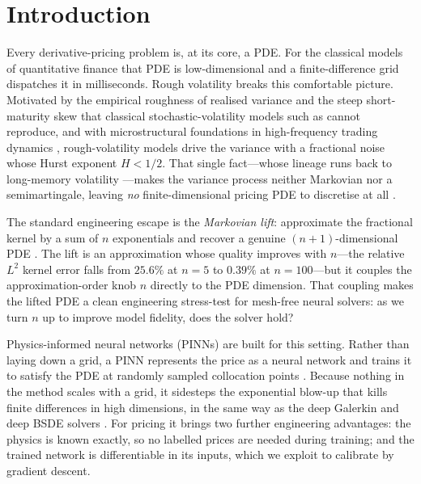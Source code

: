 \documentclass[review,12pt]{elsarticle}
\begin{document}
\section{Introduction}
\label{sec:intro}

Every derivative-pricing problem is, at its core, a PDE.  For the classical models
of quantitative finance that PDE is low-dimensional and a finite-difference grid
dispatches it in milliseconds.  Rough volatility breaks this comfortable picture.
Motivated by the empirical roughness of realised variance
\citep{gatheral2018volatility,bennedsen2022decoupling} and the steep short-maturity
skew that classical stochastic-volatility models such as \citet{heston1993closed}
cannot reproduce, and with microstructural foundations in high-frequency trading
dynamics \citep{eleuch2018microstructural}, rough-volatility models drive the
variance with a fractional noise whose Hurst exponent $H<1/2$.  That single
fact---whose lineage runs back to long-memory volatility \citep{comte1998long}---makes
the variance process neither Markovian nor a semimartingale, leaving
\emph{no} finite-dimensional pricing PDE to discretise at all
\citep{gatheral2018volatility,eleuch2019characteristic}.

The standard engineering escape is the \emph{Markovian lift}: approximate the
fractional kernel by a sum of $n$ exponentials and recover a genuine
$(n{+}1)$-dimensional PDE \citep{abijaber2019multifactor,abijaber2019lifting}.  The
lift is an approximation whose quality improves with $n$---the relative $L^2$ kernel
error falls from $25.6\%$ at $n{=}5$ to $0.39\%$ at $n{=}100$---but it couples the
approximation-order knob $n$ directly to the PDE dimension.  That coupling makes
the lifted PDE a clean engineering stress-test for mesh-free neural solvers: as we
turn $n$ up to improve model fidelity, does the solver hold?

Physics-informed neural networks (PINNs) are built for this setting.  Rather than
laying down a grid, a PINN represents the price as a neural network and trains it
to satisfy the PDE at randomly sampled collocation points
\citep{raissi2019physics}.  Because nothing in the method scales with a
grid, it sidesteps the exponential blow-up that kills finite differences in high
dimensions, in the same way as the deep Galerkin and deep BSDE solvers
\citep{sirignano2018dgm,han2018solving}.  For pricing it brings two further
engineering advantages: the physics is known exactly, so no labelled prices are
needed during training; and the trained network is differentiable in its inputs,
which we exploit to calibrate by gradient descent.
\end{document}
